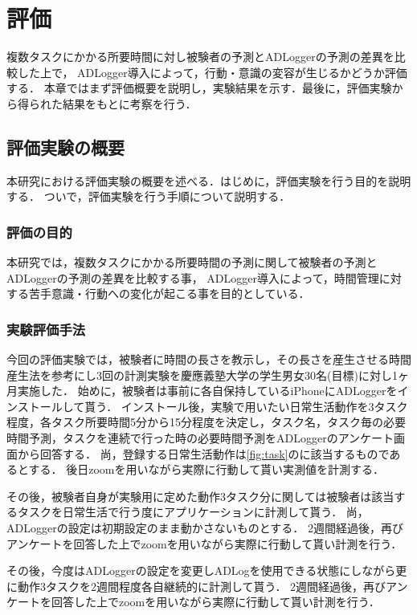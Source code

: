 \chapter{評価}
複数タスクにかかる所要時間に対し被験者の予測とADLoggerの予測の差異を比較した上で，
ADLogger導入によって，行動・意識の変容が生じるかどうか評価する．
本章ではまず評価概要を説明し，実験結果を示す．最後に，評価実験から得られた結果をもとに考察を行う．

\section{評価実験の概要}
本研究における評価実験の概要を述べる．はじめに，評価実験を行う目的を説明する．
ついで，評価実験を行う手順について説明する．

\subsection{評価の目的}
本研究では，複数タスクにかかる所要時間の予測に関して被験者の予測とADLoggerの予測の差異を比較する事，
ADLogger導入によって，時間管理に対する苦手意識・行動への変化が起こる事を目的としている．

\subsection{実験評価手法}
今回の評価実験では，被験者に時間の長さを教示し，その長さを産生させる時間産生法\cite{Oguro1961}\cite{Tayama2018}を参考にし3回の計測実験を慶應義塾大学の学生男女30名(目標)に対し1ヶ月実施した．
始めに，被験者は事前に各自保持しているiPhoneにADLoggerをインストールして貰う．
インストール後，実験で用いたい日常生活動作を3タスク程度，各タスク所要時間5分から15分程度を決定し，タスク名，タスク毎の必要時間予測，タスクを連続で行った時の必要時間予測をADLoggerのアンケート画面から回答する．
尚，登録する日常生活動作は\ref{fig:task}のに該当するものであるとする．
後日zoom\cite{zoom}を用いながら実際に行動して貰い実測値を計測する．

その後，被験者自身が実験用に定めた動作3タスク分に関しては被験者は該当するタスクを日常生活で行う度にアプリケーションに計測して貰う．
尚，ADLoggerの設定は初期設定のまま動かさないものとする．
2週間経過後，再びアンケートを回答した上でzoom\cite{zoom}を用いながら実際に行動して貰い計測を行う．

その後，今度はADLoggerの設定を変更しADLogを使用できる状態にしながら更に動作3タスクを2週間程度各自継続的に計測して貰う．
2週間経過後，再びアンケートを回答した上でzoom\cite{zoom}を用いながら実際に行動して貰い計測を行う．

